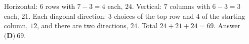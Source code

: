 Horizontal: $6$ rows with $7-3=4$ each, $24$. Vertical: $7$ columns with $6-3=3$ each, $21$. Each diagonal direction: $3$ choices of the top row and $4$ of the starting column, $12$, and there are two directions, $24$. Total $24+21+24=69$. Answer $\boxed{\textbf{(D)}\ 69}$.
